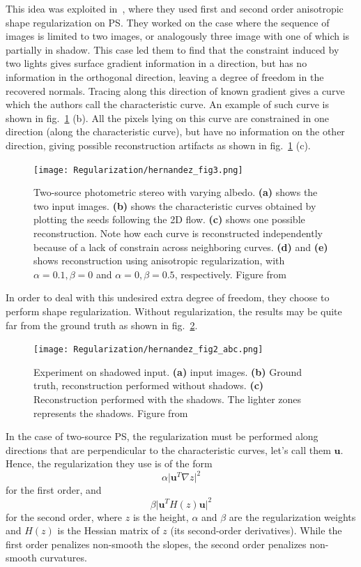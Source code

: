 This idea was exploited in~\cite{hernandez-pami-11}, where they used first and second order anisotropic shape regularization on PS. They worked on the case where the sequence of images is limited to two images, or analogously three image with one of which is partially in shadow. This case led them to find that the constraint induced by two lights gives surface gradient information in a direction, but has no information in the orthogonal direction, leaving a degree of freedom in the recovered normals. Tracing along this direction of known gradient gives a curve which the authors call the characteristic curve. An example of such curve is shown in fig.~\ref{fig:reg-her3} (b). All the pixels lying on this curve are constrained in one direction (along the characteristic curve), but have no information on the other direction, giving possible reconstruction artifacts as shown in fig.~\ref{fig:reg-her3} (c).

\begin{figure}
\centering
\texttt{[image: Regularization/hernandez\_fig3.png]}
\caption{Two-source photometric stereo with varying albedo. \textbf{(a)} shows the two input images. \textbf{(b)} shows the characteristic curves obtained by plotting the seeds following the 2D flow. \textbf{(c)} shows one possible reconstruction. Note how each curve is reconstructed independently because of a lack of constrain across neighboring curves. \textbf{(d)} and \textbf{(e)} shows reconstruction using anisotropic regularization, with $\alpha = 0.1, \beta = 0$ and $\alpha = 0, \beta = 0.5$, respectively. Figure from~\cite{hernandez-pami-11}}
\label{fig:reg-her3}
\end{figure}

In order to deal with this undesired extra degree of freedom, they choose to perform shape regularization. Without regularization, the results may be quite far from the ground truth as shown in fig.~\ref{fig:reg-her2}.

\begin{figure}
\centering
\texttt{[image: Regularization/hernandez\_fig2\_abc.png]}
\caption{Experiment on shadowed input. \textbf{(a)} input images. \textbf{(b)} Ground truth, reconstruction performed without shadows. \textbf{(c)} Reconstruction performed with the shadows. The lighter zones represents the shadows. Figure from~\cite{hernandez-pami-11}}
\label{fig:reg-her2}
\end{figure}

In the case of two-source PS, the regularization must be performed along directions that are perpendicular to the characteristic curves, let's call them $\mathbf{u}$. Hence, the regularization they use is of the form
\begin{equation}
\alpha \lvert \mathbf{u}^T \nabla z \rvert ^2
\end{equation}
for the first order, and 
\begin{equation}
\beta \lvert \mathbf{u}^T H(z) \mathbf{u} \rvert ^2
\end{equation}
for the second order, where $z$ is the height, $\alpha$ and $\beta$ are the regularization weights and $H(z)$ is the Hessian matrix of $z$ (its second-order derivatives). While the first order penalizes non-smooth the slopes, the second order penalizes non-smooth curvatures.

